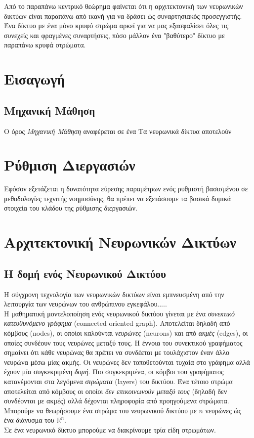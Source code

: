 \documentclass[11pt]{article} %
\numberwithin{equation}{subsection}
\begin{document}
Από το παραπάνω κεντρικό θεώρημα φαίνεται ότι η αρχιτεκτονική των νευρωνικών δικτύων είναι παραπάνω από ικανή για να δράσει ώς συναρτησιακός προσεγγιστής. Ένα δίκτυο με ένα μόνο κρυφό στρώμα αρκεί για να μας εξασφαλίσει όλες τις συνεχείς και φραγμένες συναρτήσεις, πόσο μάλλον ένα "βαθύτερο" δίκτυο με παραπάνω κρυφά στρώματα. \\

\section{Εισαγωγή}
\subsection{Μηχανική Μάθηση}
Ο όρος \textit{Μηχανική Μάθηση} αναφέρεται σε ένα 
Τα νευρωνικά δίκτυα αποτελούν 

\section{Ρύθμιση Διεργασιών}
Εφόσον εξετάζεται η δυνατότητα εύρεσης παραμέτρων ενός ρυθμιστή βασισμένου σε μεθοδολογίες τεχνιτής νοημοσύνης, θα πρέπει να εξετάσουμε τα βασικά δομικά στοιχεία του κλάδου της ρύθμισης διεργασιών.

\section{Αρχιτεκτονική Νευρωνικών Δικτύων}

\subsection{Η δομή ενός Νευρωνικού Δικτύου}

Η σύγχρονη τεχνολογία των νευρωνικών δικτύων είναι εμπνευσμένη από την λειτουργία των νευρώνων του ανθρώπινου εγκεφάλου.....\\

Η μαθηματική μοντελοποίηση ενός νευρωνικού δικτύου γίνεται με ένα \textit{συνεκτικό κατευθυνόμενο γράφημα} (connected oriented graph). Αποτελείται δηλαδή από κόμβους (nodes), οι οποίοι καλούνται \textit{νευρώνες} (neurons) και από \textit{ακμές} (edges), οι οποίες συνδέουν τους νευρώνες μεταξύ τους. Η έννοια του συνεκτικού γραφήματος σημαίνει ότι κάθε νευρώνας θα πρέπει να συνδέεται με τουλάχιστον έναν άλλο νευρώνα μέσω μίας ακμής. Οι νευρώνες δεν τοποθετούνται τυχαία στο γράφημα αλλά έχουν μία συγκεκριμένη \textit{δομή}. Πιο συγκεκριμένα, οι κόμβοι του γραφήματος κατανέμονται στα λεγόμενα \textit{στρώματα} (layers) του δικτύου. Ένα τέτοιο στρώμα αποτελείται από κόμβους οι οποίοι \textit{δεν επικοινωνούν μεταξύ τους} (δηλαδή δεν συνδέονται με ακμές) αλλά δέχονται πληροφορία από προηγούμενα στρώματα. Μπορούμε να θεωρήσουμε ένα στρώμα του νευρωνικού δικτύου με $n$ νευρώνες ώς ένα διάνυσμα του $\mathbb{R}^n$. \\
Σε ένα νευρωνικό δίκτυο μπορούμε να διακρίνουμε τρία είδη στρωμάτων.\\
\end{document}

